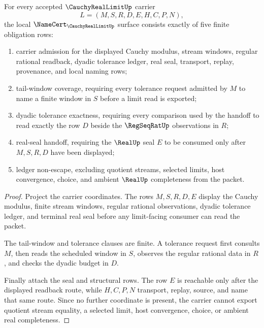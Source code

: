 \begin{theorem}
\label{thm:cauchy-real-limit-namecert-obligations}
For every accepted $\CauchyRealLimitUp$ carrier
$$
L=(M,S,R,D,E,H,C,P,N),
$$
the local $\NameCert_{\CauchyRealLimitUp}$ surface consists exactly of five finite obligation rows:
\begin{enumerate}
\item carrier admission for the displayed Cauchy modulus, stream windows, regular rational readback, dyadic tolerance ledger, real seal, transport, replay, provenance, and local naming rows;
\item tail-window coverage, requiring every tolerance request admitted by $M$ to name a finite window in $S$ before a limit read is exported;
\item dyadic tolerance exactness, requiring every comparison used by the handoff to read exactly the row $D$ beside the $\RegSeqRatUp$ observations in $R$;
\item real-seal handoff, requiring the $\RealUp$ seal $E$ to be consumed only after $M,S,R,D$ have been displayed;
\item ledger non-escape, excluding quotient streams, selected limits, host convergence, choice, and ambient $\RealUp$ completeness from the packet.
\end{enumerate}
\end{theorem}
\begin{proof}
Project the carrier coordinates. The rows $M,S,R,D,E$ display the Cauchy modulus, finite stream windows, regular rational observations, dyadic tolerance ledger, and terminal real seal before any limit-facing consumer can read the packet.

The tail-window and tolerance clauses are finite. A tolerance request first consults $M$, then reads the scheduled window in $S$, observes the regular rational data in $R$, and checks the dyadic budget in $D$.

Finally attach the seal and structural rows. The row $E$ is reachable only after the displayed readback route, while $H,C,P,N$ transport, replay, source, and name that same route. Since no further coordinate is present, the carrier cannot export quotient stream equality, a selected limit, host convergence, choice, or ambient real completeness.
\end{proof}



